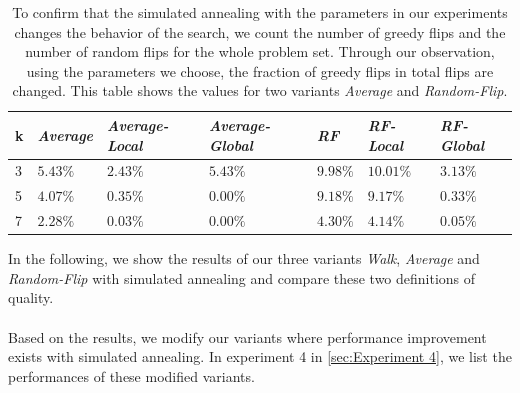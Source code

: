 \documentclass[12pt,a4paper,twoside]{scrartcl}
\numberwithin{equation}{section}
\begin{document}
\begin{table}[H]
\begin{center}
    \begin{tabular}{|l|l|l|l||l|l|p{2cm}|}
\hline 

    k &\emph{Average}&\emph{Average-Local}&\emph{Average-Global} &\emph{RF}& \emph{RF-Local}& \emph{RF-Global} \\ \hline      
    3 &$5.43\%$&$2.43\%$&$5.43\%$&$9.98\%$&$10.01\%$&$3.13\%$\\ \hline
    5& $4.07\%$&$0.35\%$&$0.00\%$&$9.18\%$&$9.17\%$&$0.33\%$\\ \hline
    7&$2.28\%$&$0.03\%$&$0.00\%$&$4.30\%$&$4.14\%$&$0.05\%$\\ \hline
\end{tabular}
\end{center}
\caption{To confirm that the simulated annealing with the parameters in our experiments changes the behavior of the search, we count the number of greedy flips and the number of random flips for the whole problem set. Through our observation, using the parameters we choose, the fraction of greedy flips in total flips are changed. This table shows the values for two variants \emph{Average} and \emph{Random-Flip}.}
\end{table} 
In the following, we show the results of  our three variants \emph{Walk}, \emph{Average} and \emph{Random-Flip} with simulated annealing and compare these two definitions of quality.\\
\\
Based on the results, we modify our variants where performance improvement exists with simulated annealing. In experiment 4 in \ref{sec:Experiment 4}, we list the performances of these modified variants.\\
\end{document}
